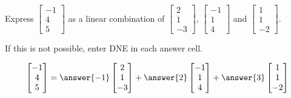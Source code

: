 \documentclass{ximera}
\begin{document}
\begin{exercise}
Express $\begin{bmatrix}-1\\4\\5\end{bmatrix}$ as a linear combination of $\begin{bmatrix}2\\1\\-3\end{bmatrix}$, $\begin{bmatrix}-1\\1\\4\end{bmatrix}$ and $\begin{bmatrix}1\\1\\-2\end{bmatrix}$.
 
If this is not possible, enter DNE in each answer cell.
 
$$\begin{bmatrix}-1\\4\\5\end{bmatrix}=\answer{-1}\begin{bmatrix}2\\1\\-3\end{bmatrix}+\answer{2}\begin{bmatrix}-1\\1\\4\end{bmatrix}+\answer{3}\begin{bmatrix}1\\1\\-2\end{bmatrix}$$
\end{exercise}
\end{document}
